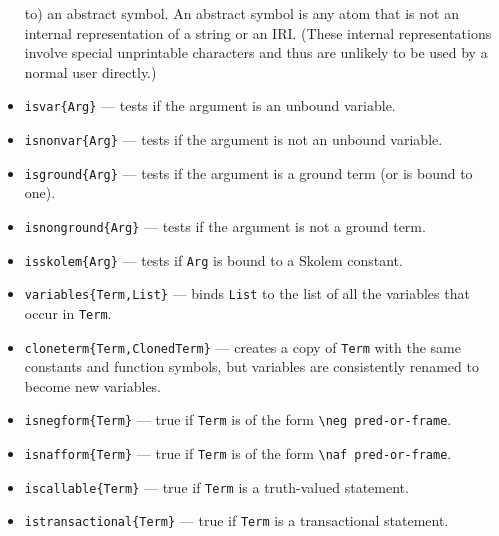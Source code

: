 \documentclass[11pt]{article}
\newcommand{\ERGO}{\mbox{\smaller{\ensuremath{\cal{E}}\smaller{{\sc{RGO}}}}}\xspace}
\newcommand{\FLSYSTEM}{\ERGO}
\newcommand{\bs}{\textbackslash}
\begin{document}
\begin{itemize}
  to) an abstract symbol. An abstract symbol is any atom that is not an
  internal representation of a string or an IRI. (These internal
  representations involve special unprintable characters and thus are
  unlikely to be used by a normal user directly.)
\item \texttt{isvar\{Arg\}} --- tests if the argument is an unbound variable.
\item \texttt{isnonvar\{Arg\}} --- tests if the argument is not an unbound variable.
\item \texttt{isground\{Arg\}} --- tests if the argument is a ground term (or
  is bound to one).
\item \texttt{isnonground\{Arg\}} --- tests if the argument is not a ground term.
\item \texttt{isskolem\{Arg\}} --- tests if \texttt{Arg} is bound to a Skolem
  constant.  
\item \texttt{variables\{Term,List\}} --- binds \texttt{List} to the list
  of all the variables that occur in \texttt{Term}.   

\item \texttt{cloneterm\{Term,ClonedTerm\}} --- creates a copy of
  \texttt{Term} with the same constants and function symbols, but variables
  are consistently renamed to become new variables.
  
\item \texttt{isnegform\{Term\}} --- true if \texttt{Term} is of the form
  \texttt{\bs{}neg pred-or-frame}.  

\item \texttt{isnafform\{Term\}} --- true if \texttt{Term} is of the form
  \texttt{\bs{}naf pred-or-frame}.  

\item \texttt{iscallable\{Term\}} --- true if \texttt{Term} is a
  truth-valued \FLSYSTEM statement.

\item \texttt{istransactional\{Term\}} --- true if \texttt{Term} is a
  transactional \FLSYSTEM statement.

\end{itemize}
\end{document}
